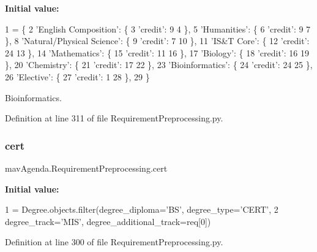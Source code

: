 {\bfseries Initial value\+:}
\begin{DoxyCode}
1 =  \{
2     \textcolor{stringliteral}{'English Composition'}: \{
3         \textcolor{stringliteral}{'credit'}: 9
4     \},
5     \textcolor{stringliteral}{'Humanities'}: \{
6         \textcolor{stringliteral}{'credit'}: 9
7     \},
8     \textcolor{stringliteral}{'Natural/Physical Science'}: \{
9         \textcolor{stringliteral}{'credit'}: 7
10     \},
11     \textcolor{stringliteral}{'IS&T Core'}: \{
12         \textcolor{stringliteral}{'credit'}: 24
13     \},
14     \textcolor{stringliteral}{'Mathematics'}: \{
15         \textcolor{stringliteral}{'credit'}: 11
16     \},
17     \textcolor{stringliteral}{'Biology'}: \{
18         \textcolor{stringliteral}{'credit'}: 16
19     \},
20     \textcolor{stringliteral}{'Chemistry'}: \{
21         \textcolor{stringliteral}{'credit'}: 17
22     \},
23     \textcolor{stringliteral}{'Bioinformatics'}: \{
24         \textcolor{stringliteral}{'credit'}: 24
25     \},
26     \textcolor{stringliteral}{'Elective'}: \{
27         \textcolor{stringliteral}{'credit'}: 1
28     \},
29 \}
\end{DoxyCode}


Bioinformatics. 



Definition at line 311 of file Requirement\+Preprocessing.\+py.

\mbox{\label{namespacemavAgenda_1_1RequirementPreprocessing_afa39381ac882387b6ad6329eed4ef3f1}} 
\subsubsection{\texorpdfstring{cert}{cert}}
{\footnotesize\ttfamily mav\+Agenda.\+Requirement\+Preprocessing.\+cert}

{\bfseries Initial value\+:}
\begin{DoxyCode}
1 =  Degree.objects.filter(degree\_diploma=\textcolor{stringliteral}{'BS'}, degree\_type=\textcolor{stringliteral}{'CERT'},
2                                  degree\_track=\textcolor{stringliteral}{'MIS'}, degree\_additional\_track=req[0])
\end{DoxyCode}


Definition at line 300 of file Requirement\+Preprocessing.\+py.

